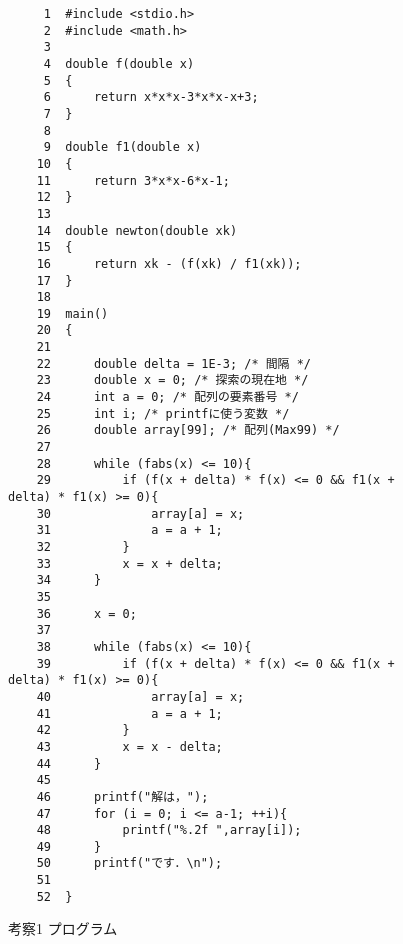 \documentclass[12pt]{jarticle}
\begin{document}
\begin{figure}[t]
\begin{screen}
\footnotesize
\begin{verbatim}
     1	#include <stdio.h>
     2	#include <math.h> 
     3	
     4	double f(double x)
     5	{
     6	    return x*x*x-3*x*x-x+3;
     7	}
     8	
     9	double f1(double x)
    10	{
    11	    return 3*x*x-6*x-1;
    12	}
    13	
    14	double newton(double xk)
    15	{
    16	    return xk - (f(xk) / f1(xk));
    17	}
    18	
    19	main()
    20	{
    21	
    22	    double delta = 1E-3; /* 間隔 */
    23	    double x = 0; /* 探索の現在地 */
    24	    int a = 0; /* 配列の要素番号 */
    25	    int i; /* printfに使う変数 */
    26	    double array[99]; /* 配列(Max99) */
    27	
    28	    while (fabs(x) <= 10){
    29	        if (f(x + delta) * f(x) <= 0 && f1(x + delta) * f1(x) >= 0){
    30	            array[a] = x;
    31	            a = a + 1;
    32	        }
    33	        x = x + delta;
    34	    }
    35	
    36	    x = 0;
    37	
    38	    while (fabs(x) <= 10){
    39	        if (f(x + delta) * f(x) <= 0 && f1(x + delta) * f1(x) >= 0){
    40	            array[a] = x;
    41	            a = a + 1;
    42	        }
    43	        x = x - delta;
    44	    }
    45	
    46	    printf("解は，");
    47	    for (i = 0; i <= a-1; ++i){
    48	        printf("%.2f ",array[i]);
    49	    }
    50	    printf("です．\n");
    51	    
    52	}
\end{verbatim}
\end{screen}
\caption{考察1 プログラム}
\label{fig:3a}
\end{figure}
\end{document}
